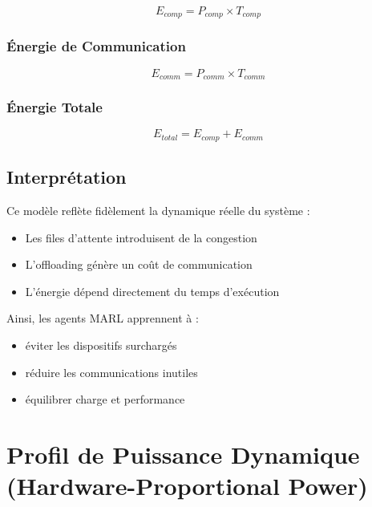 \documentclass[12pt,a4paper]{article}
\begin{document}
\begin{equation}
    E_{comp} = P_{comp} \times T_{comp}
\end{equation}

\subsubsection{Énergie de Communication}

\begin{equation}
    E_{comm} = P_{comm} \times T_{comm}
\end{equation}

\subsubsection{Énergie Totale}

\begin{equation}
    E_{total} = E_{comp} + E_{comm}
\end{equation}

 

\subsection{Interprétation}

Ce modèle reflète fidèlement la dynamique réelle du système :

\begin{itemize}
    \item Les files d’attente introduisent de la congestion
    \item L’offloading génère un coût de communication
    \item L’énergie dépend directement du temps d’exécution
\end{itemize}

Ainsi, les agents MARL apprennent à :
\begin{itemize}
    \item éviter les dispositifs surchargés
    \item réduire les communications inutiles
    \item équilibrer charge et performance
\end{itemize}

\section{Profil de Puissance Dynamique (Hardware-Proportional Power)}
\end{document}

